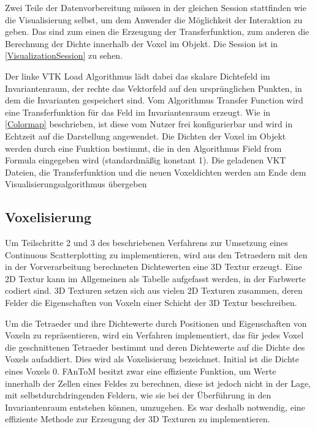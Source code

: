 \documentclass[a4paper,fontsize=12pt,toc=bib,parskip=half,ngerman]{scrartcl}
\begin{document}
Zwei Teile der Datenvorbereitung m\"ussen in der gleichen Session stattfinden wie die Visualisierung selbst, um dem Anwender die M\"oglichkeit der Interaktion zu geben. Das sind zum einen die Erzeugung der Transferfunktion, zum anderen die Berechnung der Dichte innerhalb der Voxel im Objekt. Die Session ist in \cref{VisualizationSession} zu sehen.

Der linke \glq VTK Load\grq{} Algorithmus l\"adt dabei das skalare Dichtefeld im Invariantenraum, der rechte das Vektorfeld auf den urspr\"unglichen Punkten, in dem die Invarianten gespeichert sind. Vom Algorithmus \glq Transfer Function\grq{} wird eine Transferfunktion f\"ur das Feld im Invariantenraum erzeugt. Wie in \cref{Colormap} beschrieben, ist diese vom Nutzer frei konfigurierbar und wird in Echtzeit auf die Darstellung angewendet. Die Dichten der Voxel im Objekt werden durch eine Funktion bestimmt, die in den Algorithmus \glq Field from Formula\grq{} eingegeben wird (standardm\"a{\ss}ig konstant 1). Die geladenen VKT Dateien, die Transferfunktion und die neuen Voxeldichten werden am Ende dem Visualisierungsalgorithmus \"ubergeben

\subsection{Voxelisierung}
Um Teilschritte 2 und 3 des beschriebenen Verfahrens zur Umsetzung eines Continuous Scatterplotting zu implementieren, wird aus den Tetraedern mit den in der Vorverarbeitung berechneten Dichtewerten eine 3D Textur erzeugt. Eine 2D Textur kann im Allgemeinen als Tabelle aufgefasst werden, in der Farbwerte codiert sind. 3D Texturen setzen sich aus vielen 2D Texturen zusammen, deren Felder die Eigenschaften von Voxeln einer Schicht der 3D Textur beschreiben. 

Um die Tetraeder und ihre Dichtewerte durch Positionen und Eigenschaften von Voxeln zu repr\"asentieren, wird ein Verfahren implementiert, das f\"ur jedes Voxel die geschnittenen Tetraeder bestimmt und deren Dichtewerte auf die Dichte des Voxels aufaddiert. Dies wird als Voxelisierung bezeichnet. Initial ist die Dichte eines Voxels 0. FAnToM besitzt zwar eine effiziente Funktion, um Werte innerhalb der Zellen eines Feldes zu berechnen, diese ist jedoch nicht in der Lage, mit selbstdurchdringenden Feldern, wie sie bei der \"Uberf\"uhrung in den Invariantenraum entstehen k\"onnen, umzugehen. Es war deshalb notwendig, eine effiziente Methode zur Erzeugung der 3D Texturen zu implementieren. 
\end{document}
